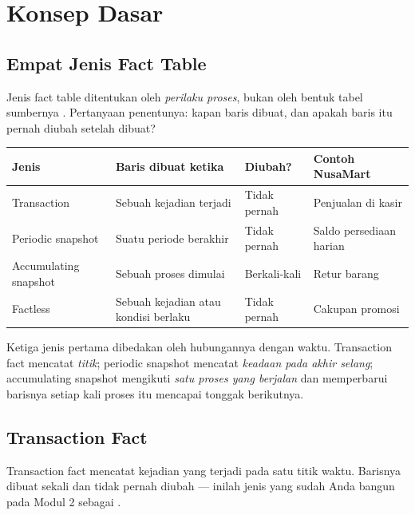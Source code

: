 \section{Konsep Dasar}

\subsection{Empat Jenis Fact Table}

Jenis fact table ditentukan oleh \emph{perilaku proses}, bukan oleh bentuk
tabel sumbernya \citep{kimball2013}. Pertanyaan penentunya: kapan baris dibuat,
dan apakah baris itu pernah diubah setelah dibuat?

\begin{center}
\small
\begin{tabular}{@{}p{}>{\raggedright\arraybackslash}p{}>{\raggedright\arraybackslash}p{}>{\raggedright\arraybackslash}p{}@{}}
\toprule
\textbf{Jenis} & \textbf{Baris dibuat ketika} & \textbf{Diubah?} &
  \textbf{Contoh NusaMart} \\
\midrule
Transaction & Sebuah kejadian terjadi & Tidak pernah &
  Penjualan di kasir \\
Periodic snapshot & Suatu periode berakhir & Tidak pernah &
  Saldo persediaan harian \\
Accumulating snapshot & Sebuah proses dimulai & Berkali-kali &
  Retur barang \\
Factless & Sebuah kejadian atau kondisi berlaku & Tidak pernah &
  Cakupan promosi \\
\bottomrule
\end{tabular}
\end{center}

Ketiga jenis pertama dibedakan oleh hubungannya dengan waktu. Transaction fact
mencatat \emph{titik}; periodic snapshot mencatat \emph{keadaan pada akhir
selang}; accumulating snapshot mengikuti \emph{satu proses yang berjalan} dan
memperbarui barisnya setiap kali proses itu mencapai tonggak berikutnya.

\subsection{Transaction Fact}

Transaction fact mencatat kejadian yang terjadi pada satu titik waktu. Barisnya
dibuat sekali dan tidak pernah diubah --- inilah jenis yang sudah Anda bangun
pada Modul 2 sebagai .

